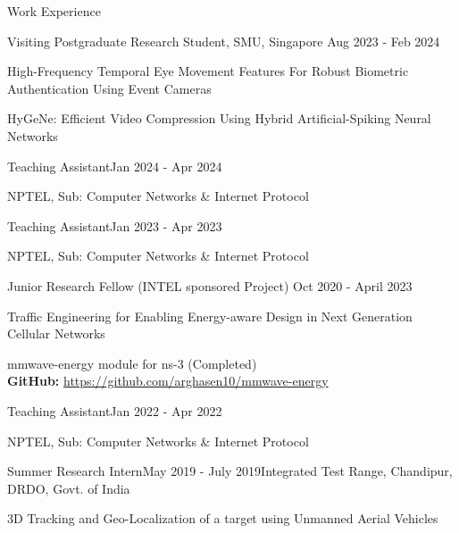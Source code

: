 \documentclass{resume} %
\begin{document}
	
	\begin{rSection}{Work Experience}
		
%			
%			
%			 
%			
		\begin{rSubsection}{Visiting Postgraduate Research Student, SMU, Singapore}  
			{Aug 2023 - Feb 2024}{}{}
			\item High-Frequency Temporal Eye Movement Features For Robust Biometric Authentication Using Event Cameras
			\item HyGeNe: Efficient Video Compression Using Hybrid Artificial-Spiking Neural Networks\\
		\end{rSubsection}
		\begin{rSubsection}{Teaching Assistant}{Jan 2024 - Apr 2024}{}{}
			\item NPTEL, Sub: Computer Networks \& Internet Protocol
		\end{rSubsection}
		
		\begin{rSubsection}{Teaching Assistant}{Jan 2023 - Apr 2023}{}{}
			\item NPTEL, Sub: Computer Networks \& Internet Protocol
		\end{rSubsection}
		
		\begin{rSubsection}{Junior Research Fellow (INTEL sponsored Project)}  
			{Oct 2020 - April 2023}{}{}
				\item Traffic Engineering for Enabling Energy-aware Design in Next Generation Cellular Networks
				\item mmwave-energy module for ns-3 (Completed)\\
				\textbf{GitHub:} \url{https://github.com/arghasen10/mmwave-energy}
		\end{rSubsection}
		
		\begin{rSubsection}{Teaching Assistant}{Jan 2022 - Apr 2022}{}{}
				\item NPTEL, Sub: Computer Networks \& Internet Protocol
		\end{rSubsection}
		
		
		\begin{rSubsection}{Summer Research Intern}{May 2019 - July 2019}{Integrated Test Range, Chandipur, DRDO, Govt. of India}{}{}
				\item 3D Tracking and Geo-Localization of a target using Unmanned Aerial Vehicles\\
		\end{rSubsection}
		

\end{rSection}
\end{document}
